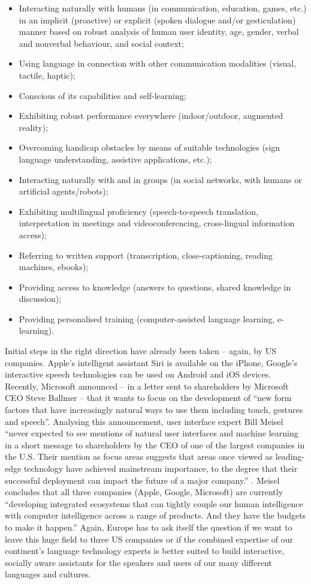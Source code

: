 \documentclass[10pt, plain]{../../metanetpaper}
\begin{document}
\begin{multicols}{2}
\begin{itemize}
\item Interacting naturally with humans (in communication, education, games, etc.) in an implicit (proactive) or explicit (spoken dialogue and/or gesticulation) manner based on robust analysis of human user identity, age, gender, verbal and nonverbal behaviour, and social context;
\item Using language in connection with other communication modalities (visual, tactile, haptic);
\item Conscious of its capabilities and self-learning;
\item Exhibiting robust performance everywhere (indoor/outdoor, augmented reality);
\item Overcoming handicap obstacles by means of suitable technologies (sign language understanding, assistive applications, etc.);
\item Interacting naturally with and in groups (in social networks, with humans or artificial agents/robots);
\item Exhibiting multilingual proficiency (speech-to-speech translation, interpretation in meetings and videoconferencing, cross-lingual information access);
\item Referring to written support (transcription, close-captioning, reading machines, ebooks);
\item Providing access to knowledge (answers to questions, shared knowledge in discussion);
\item Providing personalised training (computer-assisted language learning, e-learning).
\end{itemize}

Initial steps in the right direction have already been taken -- again, by US companies. Apple's intelligent assistant Siri is available on the iPhone, Google's interactive speech technologies can be used on Android and iOS devices. Recently, Microsoft announced -- in a letter sent to shareholders by Microsoft CEO Steve Ballmer -- that it wants to focus on the development of ``new form factors that have increasingly natural ways to use them including touch, gestures and speech''. Analysing this announcement, user interface expert Bill Meisel ``never expected to see mentions of natural user interfaces and machine learning in a short message to shareholders by the CEO of one of the largest companies in the U.S. Their mention as focus areas suggests that areas once viewed as leading-edge technology have achieved mainstream importance, to the degree that their successful deployment can impact the future of a major company.'' \cite{meisel12}. Meisel concludes that all three companies (Apple, Google, Microsoft) are currently ``developing integrated ecosystems that can tightly couple our human intelligence with computer intelligence across a range of products. And they have the budgets to make it happen.'' Again, Europe has to ask itself the question if we want to leave this huge field to three US companies or if the combined expertise of our continent's language technology experts is better suited to build interactive, socially aware assistants for the speakers and users of our many different languages and cultures.


\end{multicols}
\end{document}
